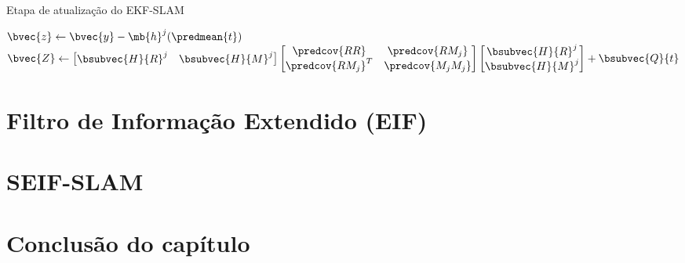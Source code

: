 \begin{algorithm}[h]
  \caption{Etapa de atualização do EKF-SLAM}
  \label{alg:ekf-slam-update}
\begin{algorithmic}[1]
  \State $\bvec{z} \gets \bvec{y} - \mb{h}^j(\predmean{t})$
  \State $\bvec{Z} \gets \begin{bmatrix}
    \bsubvec{H}{R}^j & \bsubvec{H}{M}^j
  \end{bmatrix}
  \begin{bmatrix}
    \predcov{RR} & \predcov{RM_j} \\
    \predcov{RM_j}^T & \predcov{M_j M_j}
  \end{bmatrix}
  \begin{bmatrix}
    \bsubvec{H}{R}^j \\ \bsubvec{H}{M}^j
  \end{bmatrix} + \bsubvec{Q}{t}$
  \EndProcedure
\end{algorithmic}
\end{algorithm}

\section{Filtro de Informação Extendido (EIF)}

\section{SEIF-SLAM}

\section{Conclusão do capítulo}